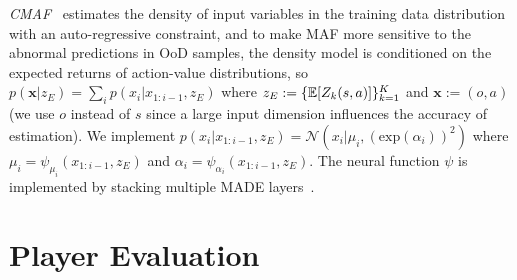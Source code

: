 \documentclass{article}
\newcommand{\modelParamter}{\omega}
\newcommand{\datapoint}{x}
\newcommand{\condition}{z_{E}}
\newcommand{\state}{s}
\newcommand{\observation}{o}
\newcommand{\action}{a}
\newcommand{\agentIndex}{k}
\newcommand{\dataset}{\mathcal{D}}
\newcommand{\expect}{\mathbb{E}}
\newcommand{\feature}{e}
\newcommand{\splitnum}{m}
\begin{document}
{\it CMAF}~\cite{Papamakarios2017MAF} estimates the density of input variables in the training data distribution with an auto-regressive constraint, and to make MAF more sensitive to the abnormal predictions in OoD samples, the density model is conditioned on the expected returns of action-value distributions, so $p(\boldsymbol{\datapoint}|{\condition})=\sum_{i}p(\datapoint_{i}|\datapoint_{1:i-1},{\condition})$  where ${\condition}:=\{\expect[Z_{\agentIndex}(\state,\action)]\}_{\agentIndex=1}^{\MakeUppercase{\agentIndex}}$ and $\boldsymbol{\datapoint}:=(\observation,\action)$ (we use $\observation$ instead of $\state$ since a large input dimension influences the accuracy of estimation). We implement $p(\datapoint_{i}|\datapoint_{1:i-1},\condition)=\mathcal{N}(\datapoint_{i}|\mu_{i},(\text{exp}(\alpha_{i}))^{2})$ where $\mu_{i}=\psi_{\mu_{i}}(\datapoint_{1:i-1},\condition)$ and $\alpha_{i} = \psi_{\alpha_{i}}(\datapoint_{1:i-1},\condition)$. The neural function $\psi$ is implemented by stacking multiple MADE layers~\cite{Dias2020NFAnomaly}.

\vspace{-0.05in}
\section{Player Evaluation}\label{Sec:player-evaluation}
\end{document}
